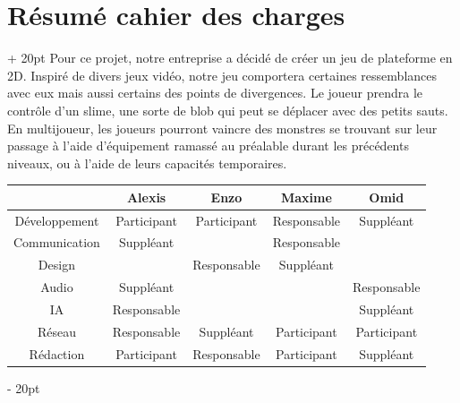 \documentclass[a4paper, 12pt, twoside]{article}
\newcommand{\ind}[1][20pt]{\advance\leftskip + #1}
\newcommand{\deind}[1][20pt]{\advance\leftskip - #1}
\newenvironment{indt}[2][20pt]{#2 \par \ind[#1]}{\par \deind} %
\begin{document}
    \begin{indt}{\section{Résumé cahier des charges}}
        Pour ce projet, notre entreprise a décidé de créer un jeu de plateforme en 2D. Inspiré de divers jeux vidéo, notre jeu comportera certaines ressemblances avec eux mais aussi certains des points de divergences. Le joueur prendra le contrôle d'un slime, une sorte de blob qui peut se déplacer avec des petits sauts. En multijoueur, les joueurs pourront vaincre des monstres se trouvant sur leur passage à l'aide d'équipement ramassé au préalable durant les précédents niveaux, ou à l'aide de leurs capacités temporaires.
    
        \begin{center}
            \begin{tabular}{|c|c|c|c|c|}
                \hline
                & Alexis & Enzo & Maxime & Omid
                \\
                \hline
                Développement & Participant & Participant & Responsable & Suppléant
                \\
                \hline
                Communication & Suppléant & & Responsable &
                \\
                \hline
                Design & & Responsable & Suppléant &
                \\
                \hline
                Audio & Suppléant & & & Responsable
                \\
                \hline
                IA & Responsable & & & Suppléant
                \\
                \hline
                Réseau & Responsable & Suppléant & Participant & Participant
                \\
                \hline
                Rédaction & Participant & Responsable & Participant & Suppléant
                \\
                \hline
            \end{tabular}
        \end{center}
    \end{indt}

    \newpage
    
\end{document}
